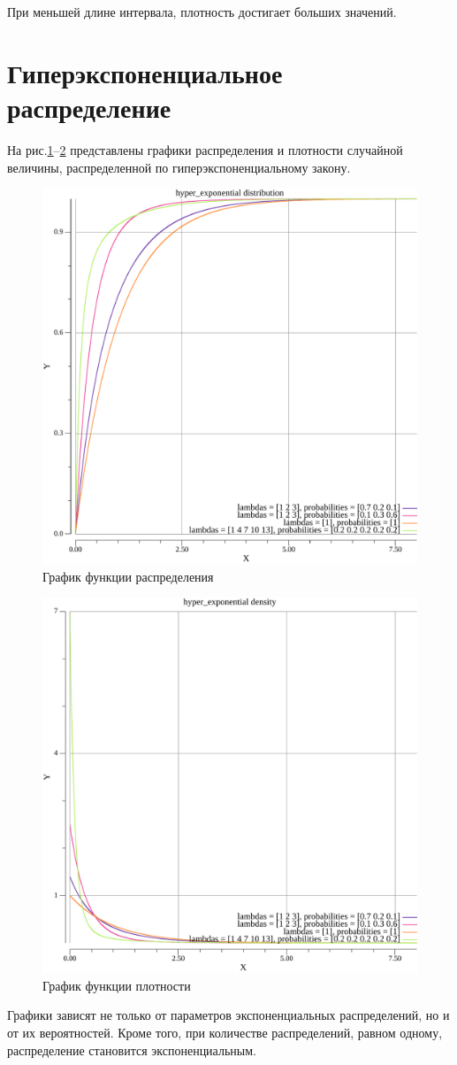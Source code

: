 При меньшей длине интервала, плотность достигает больших значений.

\newpage

\section{Гиперэкспоненциальное распределение}

На рис.\ref{fig:3}--\ref{fig:4} представлены графики распределения и плотности случайной величины, распределенной по гиперэкспоненциальному закону.

\begin{figure}[H]
    \begin{center}
    \includegraphics[width=0.7\linewidth]{../code/out/hyper_exponential/distribution/all.pdf}
    \caption{График функции распределения}
    \label{fig:3}
    \end{center}
\end{figure}

\begin{figure}[H]
    \begin{center}
    \includegraphics[width=0.7\linewidth]{../code/out/hyper_exponential/density/all.pdf}
    \caption{График функции плотности}
    \label{fig:4}
    \end{center}
\end{figure}

Графики зависят не только от параметров экспоненциальных распределений, но и от их вероятностей. Кроме того, при количестве распределений, равном одному, распределение становится экспоненциальным.


\newpage

